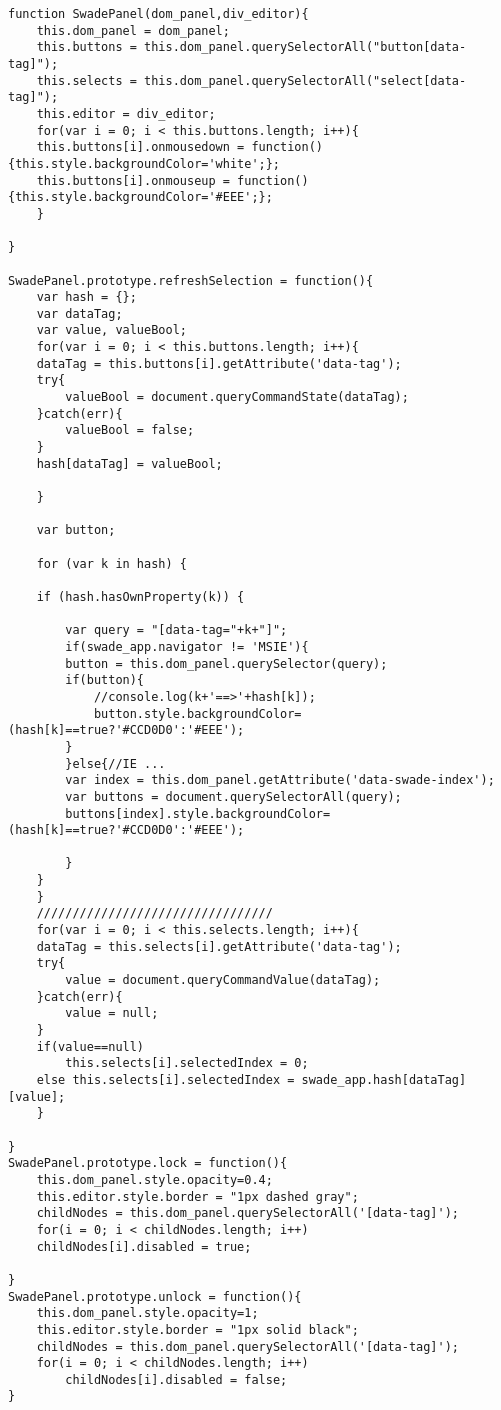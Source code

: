 \begin{lstlisting}
function SwadePanel(dom_panel,div_editor){
    this.dom_panel = dom_panel;
    this.buttons = this.dom_panel.querySelectorAll("button[data-tag]");
    this.selects = this.dom_panel.querySelectorAll("select[data-tag]");
    this.editor = div_editor;
    for(var i = 0; i < this.buttons.length; i++){
	this.buttons[i].onmousedown = function(){this.style.backgroundColor='white';};
	this.buttons[i].onmouseup = function(){this.style.backgroundColor='#EEE';};
    }

}

SwadePanel.prototype.refreshSelection = function(){
    var hash = {};
    var dataTag;
    var value, valueBool;
    for(var i = 0; i < this.buttons.length; i++){
	dataTag = this.buttons[i].getAttribute('data-tag');
	try{
	    valueBool = document.queryCommandState(dataTag);
	}catch(err){
	    valueBool = false;
	}
	hash[dataTag] = valueBool;
	
    }

    var button;

    for (var k in hash) {

	if (hash.hasOwnProperty(k)) {

	    var query = "[data-tag="+k+"]";
	    if(swade_app.navigator != 'MSIE'){
		button = this.dom_panel.querySelector(query);
		if(button){
		    //console.log(k+'==>'+hash[k]);
		    button.style.backgroundColor=(hash[k]==true?'#CCD0D0':'#EEE');
		}
	    }else{//IE ...
		var index = this.dom_panel.getAttribute('data-swade-index');
		var buttons = document.querySelectorAll(query);
		buttons[index].style.backgroundColor=(hash[k]==true?'#CCD0D0':'#EEE');

	    }
	}
    }
    /////////////////////////////////
    for(var i = 0; i < this.selects.length; i++){
	dataTag = this.selects[i].getAttribute('data-tag');
	try{
	    value = document.queryCommandValue(dataTag);
	}catch(err){
	    value = null;
	}
	if(value==null)
	    this.selects[i].selectedIndex = 0;
	else this.selects[i].selectedIndex = swade_app.hash[dataTag][value];
    }

}
SwadePanel.prototype.lock = function(){
    this.dom_panel.style.opacity=0.4;
    this.editor.style.border = "1px dashed gray";
    childNodes = this.dom_panel.querySelectorAll('[data-tag]');
    for(i = 0; i < childNodes.length; i++)
	childNodes[i].disabled = true;

}
SwadePanel.prototype.unlock = function(){
    this.dom_panel.style.opacity=1;
    this.editor.style.border = "1px solid black";
    childNodes = this.dom_panel.querySelectorAll('[data-tag]');
    for(i = 0; i < childNodes.length; i++)
        childNodes[i].disabled = false;
}

\end{lstlisting}
